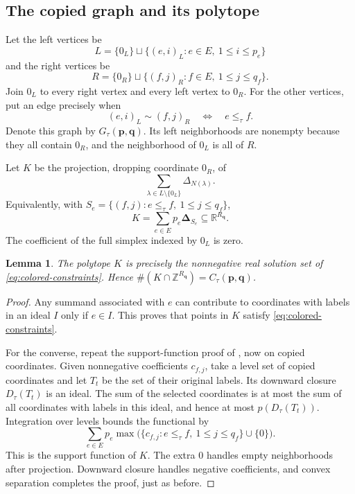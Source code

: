 \documentclass[11pt,letterpaper]{article}
\newtheorem{lemma}[lemma]{Lemma}
\theoremstyle{definition}
\newcommand{\Z}{\mathbb Z}
\newcommand{\R}{\mathbb R}
\newcommand{\pvec}{\mathbf p}
\newcommand{\qvec}{\mathbf q}
\newcommand{\ds}{\boldsymbol\Delta}
\begin{document}
\subsection{The copied graph and its polytope}
Let the left vertices be
\[
 L=\{0_L\}\sqcup\{(e,i)_L:e\in E,\ 1\leq i\leq p_e\}
\]
and the right vertices be
\[
 R=\{0_R\}\sqcup\{(f,j)_R:f\in E,\ 1\leq j\leq q_f\}.
\]
Join $0_L$ to every right vertex and every left vertex to $0_R$.
For the other vertices, put an edge precisely when
\begin{equation}\label{eq:copy-edge}
 (e,i)_L\sim(f,j)_R\quad\Longleftrightarrow\quad e\leq_\tau f.
\end{equation}
Denote this graph by $G_\tau(\pvec,\qvec)$. Its left neighborhoods are
nonempty because they all contain $0_R$, and the neighborhood of $0_L$
is all of $R$.

Let $K$ be the projection, dropping coordinate $0_R$, of
\begin{equation}\label{eq:copy-minkowski}
 \sum_{\lambda\in L\setminus\{0_L\}}\Delta_{N(\lambda)}.
\end{equation}
Equivalently, with
$S_e=\{(f,j):e\leq_\tau f,\ 1\leq j\leq q_f\}$,
\[
 K=\sum_{e\in E}p_e\ds_{S_e}\subseteq\R^{R_{\qvec}}.
\]
The coefficient of the full simplex indexed by $0_L$ is zero.

\begin{lemma}\label{lem:colored-polytope}
The polytope $K$ is precisely the nonnegative real solution set of
\eqref{eq:colored-constraints}. Hence $\#(K\cap\Z^{R_{\qvec}})
=C_\tau(\pvec,\qvec)$.
\end{lemma}
\begin{proof}
Any summand associated with $e$ can contribute to coordinates with labels
in an ideal $I$ only if $e\in I$. This proves that points in $K$ satisfy
\eqref{eq:colored-constraints}.

For the converse, repeat the support-function proof of
, now on copied coordinates. Given nonnegative
coefficients $c_{f,j}$, take a level set of copied coordinates and let $T_t$
be the set of their original labels. Its downward closure $D_\tau(T_t)$ is
an ideal. The sum of the selected coordinates is at most the sum of all
coordinates with labels in this ideal, and hence at most $p(D_\tau(T_t))$.
Integration over levels bounds the functional by
\[
 \sum_{e\in E}p_e\max\bigl(\{c_{f,j}:e\leq_\tau f,\ 1\leq j\leq q_f\}
                             \cup\{0\}\bigr).
\]
This is the support function of $K$. The extra $0$ handles empty
neighborhoods after projection. Downward closure handles negative
coefficients, and convex separation completes the proof, just as before.
\end{proof}
\end{document}
